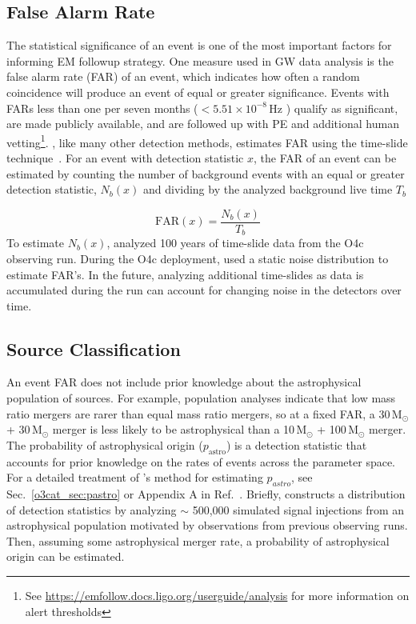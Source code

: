 \begin{refsection}
\subsection{False Alarm Rate}
The statistical significance of an event is one of the most important factors for informing EM followup strategy. 
One measure used in GW data analysis is the false alarm rate (FAR) of an event, which indicates how often a random coincidence will produce an event of equal or greater significance. 
Events with FARs less than one per seven months ($< 5.51 \times 10^{-8}$\,Hz ) qualify as significant, are made publicly available, and are followed up with PE and additional human vetting\footnote{See \url{https://emfollow.docs.ligo.org/userguide/analysis} for more information on alert thresholds}. 
\aframe, like many other detection methods, estimates FAR using the time-slide technique~\cite{Aubin_2021, Dal_Canton_2021}. 
For an event with detection statistic $x$, the FAR of an event can be estimated by counting the number of background events with an equal or greater detection statistic, $N_b(x)$ and dividing by the analyzed background live time $T_b$

\begin{equation}
    \mathrm{FAR}(x) = \frac{N_b(x)}{T_b}
\end{equation}
\noindent
To estimate $N_b(x)$, \aframe analyzed 100 years of time-slide data from the O4c observing run.
During the O4c deployment, \aframe used a static noise distribution to estimate FAR's. 
In the future, analyzing additional time-slides as data is accumulated during the run can account for changing noise in the detectors over time.


\subsection{Source Classification}
\label{online_sec:source_class}
An event FAR does not include prior knowledge about the astrophysical population of sources. 
For example, population analyses indicate that low mass ratio mergers are rarer than equal mass ratio mergers, so at a fixed FAR, a 30\,$\mathrm{M}_{\odot}$ + 30\,$\mathrm{M}_{\odot}$ merger is less likely to be astrophysical than a 10\,$\mathrm{M}_{\odot}$ + 100\,$\mathrm{M}_{\odot}$ merger. 
The probability of astrophysical origin ($p_{\mathrm{astro}}$) is a detection statistic that accounts for prior knowledge on the rates of events across the parameter space. 
For a detailed treatment of \aframe's method for estimating $p_{astro}$, see Sec.~\ref{o3cat_sec:pastro} or Appendix A in Ref.~\cite{aframe-methods}. 
Briefly, \aframe constructs a distribution of detection statistics by analyzing $\sim$ 500,000 simulated signal injections from an astrophysical population motivated by observations from previous observing runs. 
Then, assuming some astrophysical merger rate, a probability of astrophysical origin can be estimated. 



\end{refsection}
